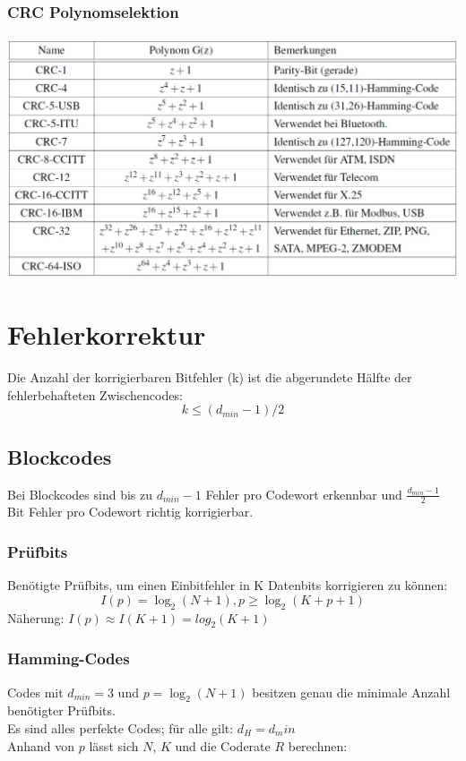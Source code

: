 \subsubsection{CRC Polynomselektion}%
\label{ssub:crc_polynomselektion}

\begin{center}
    \includegraphics[width=1\linewidth]{images/crcpol.png}
\end{center}

\section{Fehlerkorrektur}%
\label{sec:fehlerkorrektur}

Die Anzahl der korrigierbaren Bitfehler (k) ist die abgerundete Hälfte der fehlerbehafteten Zwischencodes:
\[
    k \leq (d_{min} -1)/2
\]

\subsection{Blockcodes}%
\label{sub:blockcodes}

Bei Blockcodes sind bis zu $d_{min}-1$ Fehler pro Codewort erkennbar und $\frac{d_{min}-1}{2}$ Bit Fehler pro Codewort richtig korrigierbar.

\subsubsection{Prüfbits}%
\label{ssub:prüfbits}
Benötigte Prüfbits, um einen Einbitfehler in K Datenbits korrigieren zu können:
\[
    I(p) = \log_{2}(N+1), p \geq \log_2 (K + p + 1)
\]
Näherung: $I(p) \approx I(K+1) = log_2(K+1)$

\subsubsection{Hamming-Codes}%
\label{ssub:hamming_codes}
Codes mit $d_{min} = 3$ und $p = \log_2 (N+1)$ besitzen genau die minimale Anzahl benötigter Prüfbits. \\
Es sind alles perfekte Codes; für alle gilt: $d_H = d_min$ \\
Anhand von $p$ lässt sich $N$, $K$ und die Coderate $R$ berechnen:

